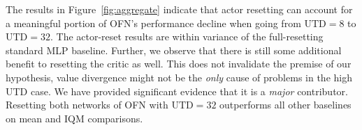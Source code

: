 The results in Figure~\ref{fig:aggregate} indicate that actor resetting can account for a meaningful portion of OFN's performance decline when going from $\mathrm{UTD}=8$ to $\mathrm{UTD}=32$. The actor-reset results are within variance of the full-resetting standard MLP baseline. Further, we observe that there is still some additional benefit to resetting the critic as well. 
This does not invalidate the premise of our hypothesis, value divergence might not be the \emph{only} cause of problems in the high UTD case. We have provided significant evidence that it is a \emph{major} contributor.
Resetting both networks of OFN with $\mathrm{UTD}=32$  outperforms all other baselines on mean and IQM comparisons. %




